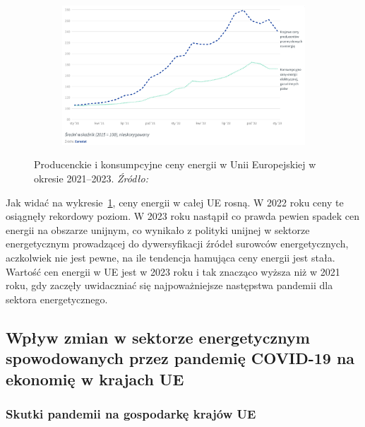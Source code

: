 \documentclass[polish, twoside, 12pt, a4paper]{article}
\theoremstyle{definition}
\theoremstyle{plain}
\theoremstyle{remark}
\begin{document}
\begin{figure}[hbt]
  \centering

  \begin{subfigure}[t]{0.45\textwidth}
    \hspace{-1.5cm}
    \includegraphics[width=1.4\textwidth]{./out_figures/figure_9}
  \end{subfigure}

  \captionsetup{margin=10pt,font=small,labelfont=bf,width=.8\textwidth}

  \caption[Producenckie i konsumpcyjne ceny energii w Unii Europejskiej w okresie 2021--2023]{Producenckie i konsumpcyjne ceny energii w Unii Europejskiej w okresie 2021--2023. \textit{Źródło:} \cite{council2023}}\label{fig:x9}
\end{figure}

Jak widać na wykresie~\ref{fig:x9}, ceny energii w całej UE rosną. W 2022 roku ceny te osiągnęły rekordowy poziom. W 2023 roku nastąpił co prawda pewien spadek cen energii na obszarze unijnym, co wynikało z polityki unijnej w sektorze energetycznym prowadzącej do dywersyfikacji źródeł surowców energetycznych, aczkolwiek nie jest pewne, na ile tendencja hamująca ceny energii jest stała. Wartość cen energii w UE jest w 2023 roku i tak znacząco wyższa niż w 2021 roku, gdy zaczęły uwidaczniać się najpoważniejsze następstwa pandemii dla sektora energetycznego. 
\subsection{Wpływ zmian w sektorze energetycznym spowodowanych przez pandemię COVID-19 na ekonomię w krajach UE}

\subsubsection{Skutki pandemii na gospodarkę krajów UE}
\end{document}
